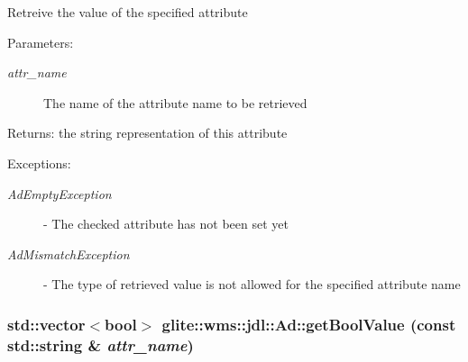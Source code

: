 Retreive the value of the specified attribute \begin{Desc}
\item[Parameters:]
\begin{description}
\item[{\em attr\_\-name}]The name of the attribute name to be retrieved \end{description}
\end{Desc}
\begin{Desc}
\item[Returns:]the string representation of this attribute \end{Desc}
\begin{Desc}
\item[Exceptions:]
\begin{description}
\item[{\em Ad\-Empty\-Exception}]- The checked attribute has not been set yet \item[{\em Ad\-Mismatch\-Exception}]- The type of retrieved value is not allowed for the specified attribute name \end{description}
\end{Desc}
\hypertarget{classglite_1_1wms_1_1jdl_1_1Ad_z19_19}{
\subsubsection[getBoolValue]{\setlength{\rightskip}{0pt plus 5cm}std::vector$<$bool$>$ glite::wms::jdl::Ad::get\-Bool\-Value (const std::string \& {\em attr\_\-name})}}
\label{classglite_1_1wms_1_1jdl_1_1Ad_z19_19}


